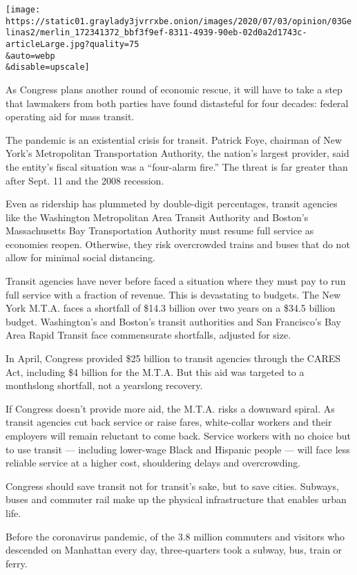 \texttt{[image: https://static01.graylady3jvrrxbe.onion/images/2020/07/03/opinion/03Gelinas2/merlin\_172341372\_bbf3f9ef-8311-4939-90eb-02d0a2d1743c-articleLarge.jpg?quality=75\\\&auto=webp\\\&disable=upscale]}

As Congress plans another round of economic rescue, it will have to take
a step that lawmakers from both parties have found distasteful for four
decades: federal operating aid for mass transit.

The pandemic is an existential crisis for transit. Patrick Foye,
chairman of New York's Metropolitan Transportation Authority, the
nation's largest provider, said the entity's fiscal situation was a
``four-alarm fire.'' The threat is far greater than after Sept. 11 and
the 2008 recession.

Even as ridership has plummeted by double-digit percentages, transit
agencies like the Washington Metropolitan Area Transit Authority and
Boston's Massachusetts Bay Transportation Authority must resume full
service as economies reopen. Otherwise, they risk overcrowded trains and
buses that do not allow for minimal social distancing.

Transit agencies have never before faced a situation where they must pay
to run full service with a fraction of revenue. This is devastating to
budgets. The New York M.T.A. faces a shortfall of \$14.3 billion over
two years on a \$34.5 billion budget. Washington's and Boston's transit
authorities and San Francisco's Bay Area Rapid Transit face commensurate
shortfalls, adjusted for size.

In April, Congress provided \$25 billion to transit agencies through the
CARES Act, including \$4 billion for the M.T.A. But this aid was
targeted to a monthslong shortfall, not a yearslong recovery.

If Congress doesn't provide more aid, the M.T.A. risks a downward
spiral. As transit agencies cut back service or raise fares,
white-collar workers and their employers will remain reluctant to come
back. Service workers with no choice but to use transit --- including
lower-wage Black and Hispanic people --- will face less reliable service
at a higher cost, shouldering delays and overcrowding.

Congress should save transit not for transit's sake, but to save cities.
Subways, buses and commuter rail make up the physical infrastructure
that enables urban life.

Before the coronavirus pandemic, of the 3.8 million commuters and
visitors who descended on Manhattan every day, three-quarters took a
subway, bus, train or ferry.


